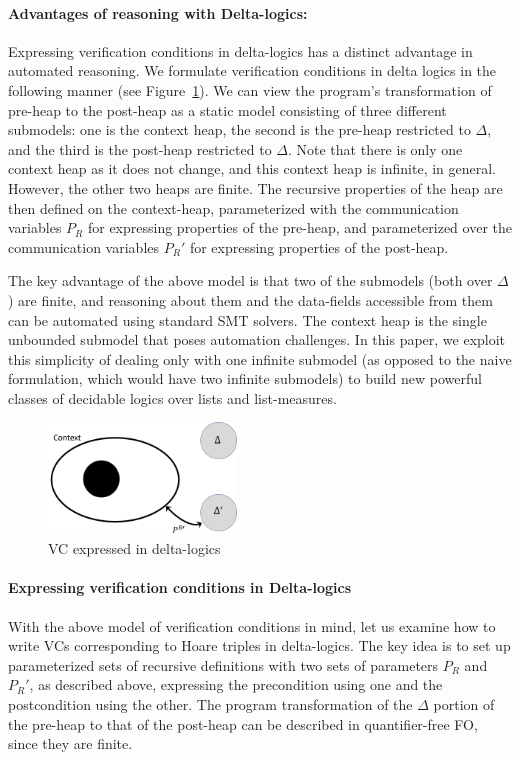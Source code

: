 \paragraph{Advantages of reasoning with Delta-logics:}
Expressing verification conditions in delta-logics has a distinct advantage in automated reasoning. We formulate verification conditions in delta logics in the following manner (see Figure~\ref{blobs}).
We can view the program's transformation of pre-heap to the post-heap as a static model consisting of three different submodels: one is the context heap, the second is the pre-heap restricted to $\Delta$, and the third is the post-heap restricted to  $\Delta$.
Note that there is only one context heap as it does not change, and this context heap is infinite, in general. However, the other two heaps are finite. The recursive properties of the heap are then defined  on the context-heap, parameterized with the communication variables $P_R$ for expressing properties of the pre-heap, and parameterized over the communication variables $P_R'$ for expressing properties of the post-heap.

The key advantage of the above model is that
two of the submodels (both over $\Delta$) are finite, and reasoning about them and the data-fields accessible from them can be automated using standard SMT solvers.
The context heap is the single unbounded submodel that poses automation challenges. In this paper, we exploit this simplicity of dealing only with one infinite submodel (as opposed to the naive formulation, which would have two infinite submodels) to build new powerful classes of decidable logics over lists and list-measures. 

\begin{figure}
  \includegraphics[width= 50mm]{3blobs.png}
  \caption{VC expressed in delta-logics}
  \label{blobs}
\end{figure}


\paragraph{Expressing verification conditions in Delta-logics}
With the above model of verification conditions in mind, let us examine how to write VCs corresponding to Hoare triples in delta-logics. The key idea is to set up parameterized sets of recursive definitions with two sets of parameters $P_R$ and $P_R'$, as described above, expressing the precondition using
one and the postcondition using the other. The program transformation of the $\Delta{}$ portion of the pre-heap to that of the post-heap can be described in quantifier-free FO,  since they are finite.

